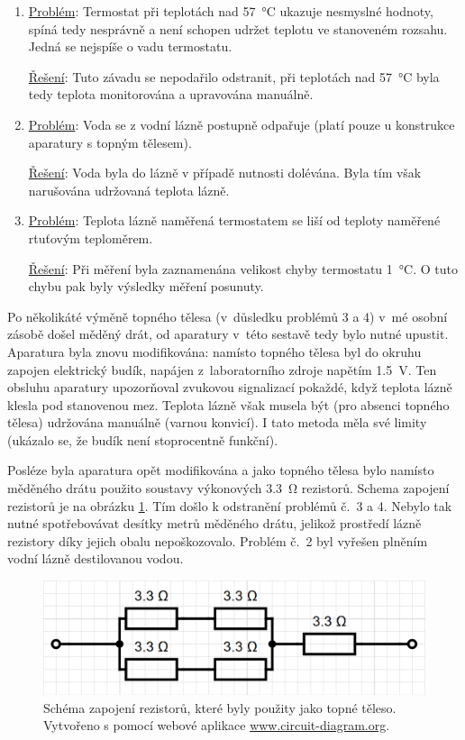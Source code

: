 \documentclass[12pt]{article}
\begin{document}
\begin{enumerate}[noitemsep, topsep = 0pt]
    \par \underline{Řešení}: Vrstva oxidu byla v~pravidelných intervalech odstraňována pomocí nože nebo smirkového papíru, případně bylo celé topné těleso nahrazeno novým.
    \item \underline{Problém}: Termostat při teplotách nad \SI{57}{\degreeCelsius} ukazuje nesmyslné hodnoty, spíná tedy nesprávně a není schopen udržet teplotu ve stanoveném rozsahu. Jedná se nejspíše o vadu termostatu.
    \par \underline{Řešení}: Tuto závadu se nepodařilo odstranit, při teplotách nad \SI{57}{\degreeCelsius} byla tedy teplota monitorována a upravována manuálně.
    \item \underline{Problém}: Voda se z vodní lázně postupně odpařuje (platí pouze u konstrukce aparatury s topným tělesem).
    \par \underline{Řešení}: Voda byla do lázně v případě nutnosti dolévána. Byla tím však narušována udržovaná teplota lázně.
    \item \underline{Problém}: Teplota lázně naměřená termostatem se liší od teploty naměřené rtuťovým teploměrem.
    \par \underline{Řešení}: Při měření byla zaznamenána velikost chyby termostatu \SI{1}{\degreeCelsius}. O tuto chybu pak byly výsledky měření posunuty.
\end{enumerate}
Po několikáté výměně topného tělesa (v~důsledku problémů 3 a 4) v~mé osobní zásobě došel měděný drát, od aparatury v~této sestavě tedy bylo nutné upustit. Aparatura byla znovu modifikována: namísto topného tělesa byl do okruhu zapojen elektrický budík, napájen z~laboratorního zdroje napětím \SI{1,5}{\volt}. Ten obsluhu aparatury upozorňoval zvukovou signalizací pokaždé, když teplota lázně klesla pod stanovenou mez. Teplota lázně však musela být (pro absenci topného tělesa) udržována manuálně (varnou konvicí). I tato metoda měla své limity (ukázalo se, že budík není stoprocentně funkční).
\par
Posléze byla aparatura opět modifikována a jako topného tělesa bylo namísto měděného drátu použito soustavy výkonových \SI{3,3}{\ohm} rezistorů. Schema zapojení rezistorů je na obrázku \ref{fig:schema_zapojeni_rezistory}. Tím došlo k odstranění problémů č.~3 a 4. Nebylo tak nutné spotřebovávat desítky metrů měděného drátu, jelikož prostředí lázně rezistory díky jejich obalu nepoškozovalo. Problém č.~2 byl vyřešen plněním vodní lázně destilovanou vodou. 
\par\noindent
\begin{figure}
    \centering
    \includegraphics[width = 0.75\linewidth]{figures/rezistory.png}
    \caption{Schéma zapojení rezistorů, které byly použity jako topné těleso. Vytvořeno s pomocí webové aplikace \url{www.circuit-diagram.org}.}
    \label{fig:schema_zapojeni_rezistory}
\end{figure}
\end{document}
